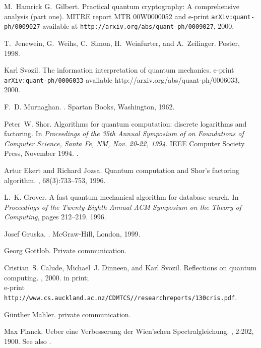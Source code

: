 \documentclass [11pt]{llncs}
\begin{document}
\begin{thebibliography}{10}
M.~Hamrick G.~Gilbert.
\newblock Practical quantum cryptography: A comprehensive analysis (part one).
\newblock MITRE report MTR 00W0000052 and e-print {\tt arXiv:quant-ph/0009027}
  available at {\tt http://arxiv.org/abs/quant-ph/0009027}, 2000.

T.~Jenewein, G.~Weihs, C.~Simon, H.~Weinfurter, and A.~Zeilinger.
\newblock Poster, 1998.

Karl Svozil.
\newblock The information interpretation of quantum mechanics.
\newblock e-print {\tt arXiv:quant-ph/0006033} available
  {http://arxiv.org/abs/quant-ph/0006033}, 2000.

F.~D. Murnaghan.
.
\newblock Spartan Books, Washington, 1962.

Peter~W. Shor.
\newblock Algorithms for quantum computation: discrete logarithms and
  factoring.
\newblock In {\em Proceedings of the 35th Annual Symposium of on Foundations of
  Computer Science, Santa Fe, NM, Nov. 20-22, 1994}. IEEE Computer Society
  Press, November 1994.
.

Artur Ekert and Richard Jozsa.
\newblock Quantum computation and {S}hor's factoring algorithm.
, 68(3):733--753, 1996.

L.~K. Grover.
\newblock A fast quantum mechanical algorithm for database search.
\newblock In {\em Proceedings of the Twenty-Eighth Annual ACM Symposium on the
  Theory of Computing}, pages 212--219. 1996.

Josef Gruska.
.
\newblock McGraw-Hill, London, 1999.

Georg Gottlob.
\newblock Private communication.

Cristian~S. Calude, Michael~J. Dinneen, and Karl Svozil.
\newblock Reflections on quantum computing.
, 2000.
\newblock in print;\\e-print {\tt
  http://www.cs.auckland.ac.nz/CDMTCS//researchreports/130cris.pdf}.

G{\"{u}}nther Mahler.
\newblock private communication.

Max Planck.
\newblock Ueber eine {V}erbesserung der {W}ien'schen {S}pectralgleichung.
, 2:202,
  1900.
\newblock See also \cite{planck:1901b}.


\end{thebibliography}
\end{document}
